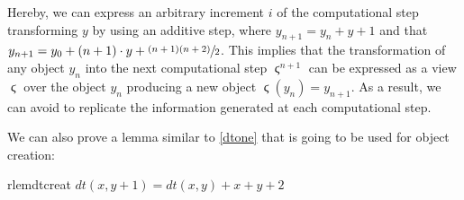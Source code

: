 Hereby, we can express an arbitrary increment $i$ of the computational step transforming $y$ by using an additive step, where $y_{n+1}=y_n+y+1$ and that $y_{n+1}=y_0+(n+1)\cdot y+\sfrac{(n+1)(n+2)}{2}$. This implies that the transformation of any object $y_n$ into the next computational step $\stigma^{n+1}$ can be expressed as a view $\stigma$ over the object $y_n$ producing a new object $\stigma(y_n)=y_{n+1}$. As a result, we can avoid to replicate the information generated at each computational step.

We can also prove a lemma similar to \ref{dtone} that is going to be used for object creation:
\begin{restatable}{rlem}{dtcreat}
	\label{dtcreat}
	$dt(x,y+1)=dt(x,y)+x+y+2$
\end{restatable}


%
%	

